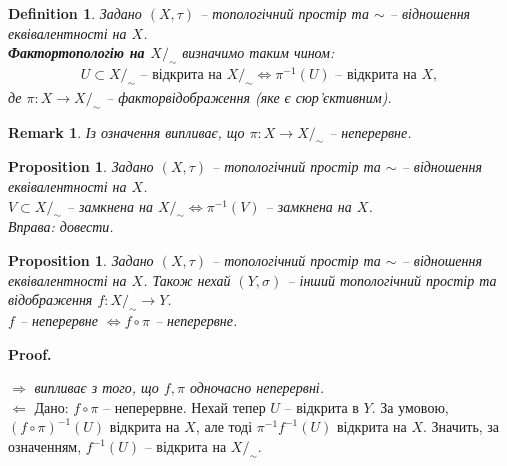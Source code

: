 \documentclass[a4paper, 10pt]{article}
\makeatletter
\def\rightproof{$\boxed{\Rightarrow}$ }
\def\leftproof{$\boxed{\Leftarrow}$ }
\theoremstyle{theoremdd}
\newtheorem{definition}[theorem]{Definition}
\newtheorem{proposition}[theorem]{Proposition}
\newtheorem{remark}[theorem]{Remark}
\renewenvironment{proof}[1][Proof.\\]{\par
\pushQED{\hfill \qed}%
\normalfont \topsep6\p@\@plus6\p@\relax
\trivlist
\item\relax
{\bfseries
#1\@addpunct{.}}\hspace\labelsep\ignorespaces
}{%
\popQED\endtrivlist\@endpefalse
}
\makeatother
\begin{document}
\begin{definition}
Задано $(X,\tau)$ -- топологічний простір та $\sim$ -- відношення еквівалентності на $X$.\\
\textbf{Фактортопологію на $X/_\sim$} визначимо таким чином:
\begin{align*}
U \subset X/_\sim \text{ -- відкрита на } X/_\sim \iff \pi^{-1}(U) \text{ -- відкрита на }X,
\end{align*}
де $\pi \colon X \to X/_\sim$ -- факторвідображення (яке є сюр'єктивним).
\end{definition}

\begin{remark}
Із означення випливає, що $\pi \colon X \to X/_\sim$ -- неперервне.
\end{remark}

\begin{proposition}
Задано $(X,\tau)$ -- топологічний простір та $\sim$ -- відношення еквівалентності на $X$.\\
$V \subset X/_\sim$ -- замкнена на $X/_\sim \iff \pi^{-1}(V)$ -- замкнена на $X$.\\
\textit{Вправа: довести.}
\end{proposition}

\begin{proposition}
Задано $(X,\tau)$ -- топологічний простір та $\sim$ -- відношення еквівалентності на $X$. Також нехай $(Y,\sigma)$ -- інший топологічний простір та відображення $f \colon X/_\sim \to Y$.\\
$f$ -- неперервне $\iff f \circ \pi$ -- неперервне.
\end{proposition}

\begin{proof}
\rightproof \textit{випливає з того, що $f,\pi$ одночасно неперервні.}
\bigskip \\
\leftproof Дано: $f \circ \pi$ -- неперервне. Нехай тепер $U$ -- відкрита в $Y$. За умовою, $(f \circ \pi)^{-1}(U)$ відкрита на $X$, але тоді $\pi^{-1} f^{-1}(U)$ відкрита на $X$. Значить, за означенням, $f^{-1}(U)$ -- відкрита на $X/_\sim$.
\end{proof}
\end{document}
